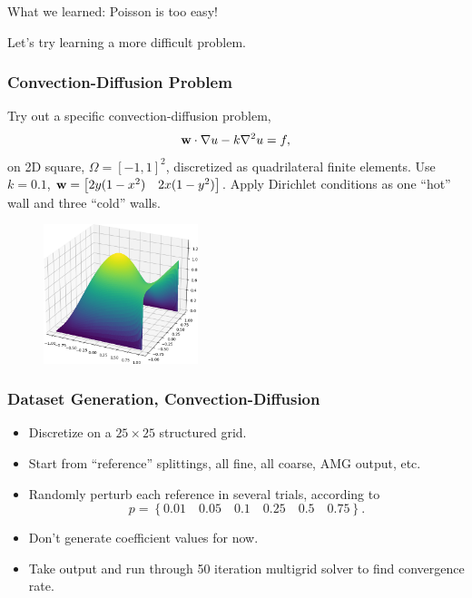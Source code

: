 \documentclass[handout]{beamer}
\renewcommand{\vec}[1]{ {\bf #1} }
\begin{document}
\begin{frame}
  What we learned: \pause Poisson is too easy!
  \newline\newline
  \pause

  Let's try learning a more difficult problem.
\end{frame}


\begin{frame}
  \frametitle{Convection-Diffusion Problem}
  Try out a specific convection-diffusion problem,
  \[\vec{w}\cdot\nabla u -k\nabla^2u = f,\]
  on 2D square, $\Omega = \left[-1,1\right]^2$, discretized as quadrilateral finite elements.  Use  $k=0.1$, $\vec{w} = \begin{bmatrix} 2y(1-x^2) & 2x(1-y^2)  \end{bmatrix}$.  Apply Dirichlet conditions as one ``hot'' wall and three ``cold'' walls.
  \begin{figure}[h]
    \includegraphics[width=0.4\textwidth]{figures/recirculating.png}
  \end{figure}
\end{frame}


\begin{frame}
  \frametitle{Dataset Generation, Convection-Diffusion}
  \begin{itemize}
  \item Discretize on a $25 \times 25$ structured grid.
  \item Start from ``reference'' splittings, all fine, all coarse, AMG output, etc.
  \item Randomly perturb each reference in several trials, according to \[ p = \left\{ 0.01 \quad 0.05 \quad 0.1 \quad 0.25 \quad 0.5 \quad 0.75 \right\}. \]
  \item Don't generate coefficient values for now.
  \item Take output and run through 50 iteration multigrid solver to find convergence rate.
  \end{itemize}
\end{frame}
\end{document}
